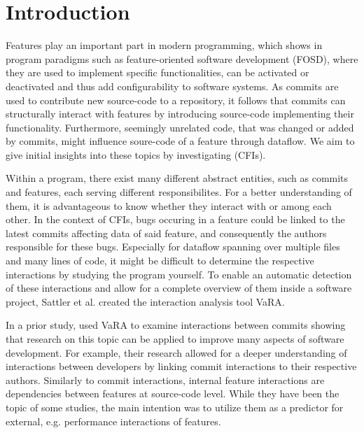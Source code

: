 \chapter{Introduction}\label{ch:introduction}

Features play an important part in modern programming, which shows in program paradigms such as feature-oriented software development (FOSD),
where they are used to implement specific functionalities, can be activated or deactivated and thus add configurability to software systems.
As commits are used to contribute new source-code to a repository, it follows that commits can structurally interact with features by introducing source-code implementing their functionality. 
Furthermore, seemingly unrelated code, that was changed or added by commits, might influence soure-code of a feature through dataflow.
We aim to give initial insights into these topics by investigating  (CFIs).

Within a program, there exist many different abstract entities, such as commits and features, each serving different responsibilites.
For a better understanding of them, it is advantageous to know whether they interact with or among each other.
In the context of CFIs, bugs occuring in a feature could be linked to the latest commits affecting data of said feature, and consequently the authors responsible for these bugs.
Especially for dataflow spanning over multiple files and many lines of code, it might be difficult to determine the respective interactions by studying the program yourself.
To enable an automatic detection of these interactions and allow for a complete overview of them inside a software project, Sattler et al.\cite{sattler2023thesis} created the interaction analysis tool VaRA\cite{VaRA2023}.

In a prior study, \citet{sattler2023seal} used VaRA to examine interactions between commits showing that research on this topic can be applied to improve many aspects of software development.
For example, their research allowed for a deeper understanding of interactions between developers by linking commit interactions to their respective authors\cite{sattler2023seal}. 
Similarly to commit interactions, internal feature interactions are dependencies between features at source-code level. 
While they have been the topic of some studies\cite{kolesnikov2017relation}, the main intention was to utilize them as a predictor for external, e.g. performance interactions\cite{siegmund2012predicting} of features.

